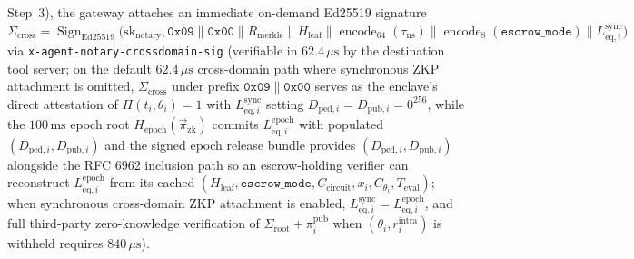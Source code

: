 \documentclass[conference,10pt]{IEEEtran}
\begin{document}
\begin{enumerate}
Step~3), the gateway attaches an immediate on-demand Ed25519 signature $\Sigma_{\text{cross}} = \operatorname{Sign}_{\text{Ed25519}}\big(\text{sk}_{\text{notary}}, \mathtt{0x09} \parallel \mathtt{0x00} \parallel R_{\text{merkle}} \parallel H_{\text{leaf}} \parallel \operatorname{encode}_{64}(\tau_{\text{ns}}) \parallel \operatorname{encode}_8(\texttt{escrow\_mode}) \parallel L_{\text{eq}, i}^{\text{sync}}\big)$ via \texttt{x-agent-notary-crossdomain-sig} (verifiable in $62.4\,\mu\text{s}$ by the destination tool server; on the default $62.4\,\mu\text{s}$ cross-domain path where synchronous ZKP attachment is omitted, $\Sigma_{\text{cross}}$ under prefix $\mathtt{0x09} \parallel \mathtt{0x00}$ serves as the enclave's direct attestation of $\Pi(t_i, \theta_i) = 1$ with $L_{\text{eq}, i}^{\text{sync}}$ setting $D_{\text{ped}, i} = D_{\text{pub}, i} = 0^{256}$, while the $100\,\text{ms}$ epoch root $H_{\text{epoch}}(\vec{\pi}_{\text{zk}})$ commits $L_{\text{eq}, i}^{\text{epoch}}$ with populated $(D_{\text{ped}, i}, D_{\text{pub}, i})$ and the signed epoch release bundle provides $(D_{\text{ped}, i}, D_{\text{pub}, i})$ alongside the RFC 6962 inclusion path so an escrow-holding verifier can reconstruct $L_{\text{eq}, i}^{\text{epoch}}$ from its cached $(H_{\text{leaf}}, \texttt{escrow\_mode}, C_{\text{circuit}}, x_i, C_{\theta_i}, T_{\text{eval}})$; when synchronous cross-domain ZKP attachment is enabled, $L_{\text{eq}, i}^{\text{sync}} = L_{\text{eq}, i}^{\text{epoch}}$, and full third-party zero-knowledge verification of $\Sigma_{\text{root}} + \pi_i^{\text{pub}}$ when $(\theta_i, r_i^{\text{intra}})$ is withheld requires $840\,\mu\text{s}$).
\end{enumerate}
\end{document}
